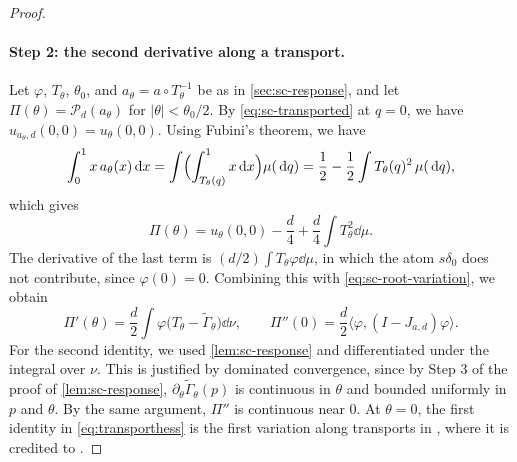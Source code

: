 \begin{proof}
\paragraph{Step 2: the second derivative along a transport.}
Let $\varphi$, $T_\theta$, $\theta_0$, and $a_\theta=a\circ T_\theta^{-1}$
be as in \cref{sec:sc-response}, and let
$\Pi(\theta)=\mathcal P_d(a_\theta)$ for $|\theta|<\theta_0/2$. By
\eqref{eq:sc-transported} at $q=0$, we have
$u_{a_\theta,d}(0,0)=u_\theta(0,0)$. Using Fubini's theorem, we have
\[
 \int_0^1x\,a_\theta(x)\,\mathrm d x
 =\int\Bigl(\int_{T_\theta(q)}^1x\,\mathrm d x\Bigr)\mu(\,\mathrm d q)
 =\frac12-\frac12\int T_\theta(q)^2\,\mu(\,\mathrm d q),
\]
which gives
\[
 \Pi(\theta)=u_\theta(0,0)-\frac d4+\frac d4\int T_\theta^2\dd\mu .
\]
The derivative of the last term is $(d/2)\int T_\theta\varphi\dd\mu$,
in which the atom $s\delta_0$ does not contribute, since $\varphi(0)=0$.
Combining this with \eqref{eq:sc-root-variation}, we obtain
\begin{equation}\label{eq:transporthess}
 \Pi'(\theta)=\frac d2\int\varphi\bigl(T_\theta-\widetilde\Gamma_\theta\bigr)\dd\nu,
 \qquad
 \Pi''(0)=\frac d2\langle\varphi,(I-J_{a,d})\varphi\rangle .
\end{equation}
For the second identity, we used \cref{lem:sc-response} and
differentiated under the integral over $\nu$. This is justified by
dominated convergence, since by Step 3 of the proof of
\cref{lem:sc-response}, $\partial_\theta\widetilde\Gamma_\theta(p)$ is
continuous in $\theta$ and bounded uniformly in $p$ and $\theta$. By
the same argument, $\Pi''$ is continuous near $0$. At $\theta=0$, the first identity
in \eqref{eq:transporthess} is the first variation along transports in
\cite[Section~3, (19)]{AuffingerChen2015Properties}, where it is
credited to \cite[Lemma~3.7, Eq.~(3.34)]{Talagrand2006ParisiMeasures}.


\end{proof}
